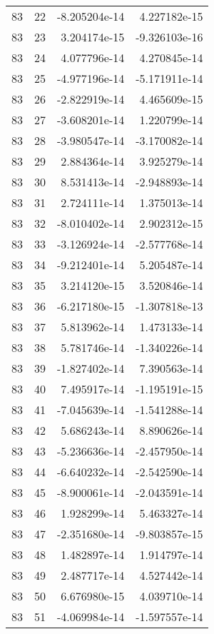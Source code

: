 \begin{tabular}{rrrr}
  83 &   22 & -8.205204e-14 &  4.227182e-15 \\
  83 &   23 &  3.204174e-15 & -9.326103e-16 \\
  83 &   24 &  4.077796e-14 &  4.270845e-14 \\
  83 &   25 & -4.977196e-14 & -5.171911e-14 \\
  83 &   26 & -2.822919e-14 &  4.465609e-15 \\
  83 &   27 & -3.608201e-14 &  1.220799e-14 \\
  83 &   28 & -3.980547e-14 & -3.170082e-14 \\
  83 &   29 &  2.884364e-14 &  3.925279e-14 \\
  83 &   30 &  8.531413e-14 & -2.948893e-14 \\
  83 &   31 &  2.724111e-14 &  1.375013e-14 \\
  83 &   32 & -8.010402e-14 &  2.902312e-15 \\
  83 &   33 & -3.126924e-14 & -2.577768e-14 \\
  83 &   34 & -9.212401e-14 &  5.205487e-14 \\
  83 &   35 &  3.214120e-15 &  3.520846e-14 \\
  83 &   36 & -6.217180e-15 & -1.307818e-13 \\
  83 &   37 &  5.813962e-14 &  1.473133e-14 \\
  83 &   38 &  5.781746e-14 & -1.340226e-14 \\
  83 &   39 & -1.827402e-14 &  7.390563e-14 \\
  83 &   40 &  7.495917e-14 & -1.195191e-15 \\
  83 &   41 & -7.045639e-14 & -1.541288e-14 \\
  83 &   42 &  5.686243e-14 &  8.890626e-14 \\
  83 &   43 & -5.236636e-14 & -2.457950e-14 \\
  83 &   44 & -6.640232e-14 & -2.542590e-14 \\
  83 &   45 & -8.900061e-14 & -2.043591e-14 \\
  83 &   46 &  1.928299e-14 &  5.463327e-14 \\
  83 &   47 & -2.351680e-14 & -9.803857e-15 \\
  83 &   48 &  1.482897e-14 &  1.914797e-14 \\
  83 &   49 &  2.487717e-14 &  4.527442e-14 \\
  83 &   50 &  6.676980e-15 &  4.039710e-14 \\
  83 &   51 & -4.069984e-14 & -1.597557e-14 \\

\end{tabular}
